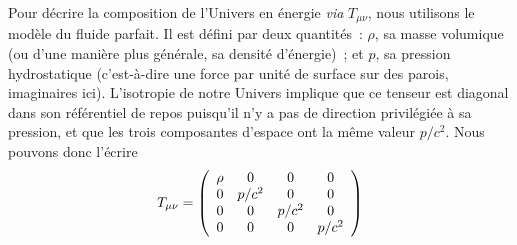 \documentclass[../main/main.tex]{subfiles}
\begin{document}
Pour décrire la composition de l'Univers en énergie \textit{via} $T_{\mu\nu}$,
nous utilisons le modèle du fluide parfait. Il est défini par deux quantités~:
$\rho$, sa masse volumique (ou d'une manière plus générale, sa densité
d'énergie)~; et $p$, sa pression hydrostatique (c'est-à-dire une force par unité
de surface sur des parois, imaginaires ici). L'isotropie de notre Univers
implique que ce tenseur est diagonal dans son référentiel de repos puisqu'il
n'y a pas de direction privilégiée à sa pression, et que les trois composantes
d'espace ont la même valeur $p/c^2$. Nous pouvons donc l'écrire
\begin{equation}
    T_{\mu\nu} = \left(\begin{array}{c c c c}
            \rho & 0 & 0 & 0\\
            0 & p/c^2 & 0 & 0\\
            0 & 0 & p/c^2 & 0\\
            0 & 0 & 0 & p/c^2\\
    \end{array}\right)
\end{equation}
\end{document}
